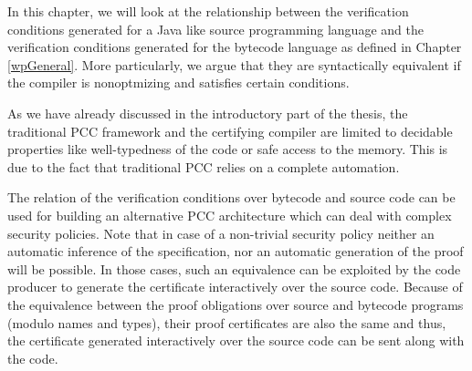 

In this chapter, we will look at the relationship between
the verification conditions generated for a Java like source programming 
language and the verification conditions generated for the bytecode language 
as defined in Chapter \ref{wpGeneral}. More particularly, we 
argue that they are syntactically equivalent if the compiler is nonoptmizing and satisfies certain 
conditions.
 

As we have already discussed in the introductory part of the thesis, the traditional PCC framework 
and the certifying compiler are limited to decidable properties like well-typedness of the code
or safe access to the memory. This is due to the fact that traditional PCC relies on a complete automation.




The relation of the verification conditions over bytecode and source code can be used for building an
 alternative PCC architecture which can deal with complex security policies. Note that in case of a non-trivial 
security policy neither an automatic inference of the specification, nor an automatic generation 
of the proof will be possible.
In those cases, such an equivalence can be exploited by the code producer to generate
 the certificate interactively over the source code. Because of the
equivalence between the proof obligations over source and bytecode programs (modulo names and types), 
their  proof certificates are also the same and thus, the certificate generated interactively over the
 source code can be sent along with the code.   


